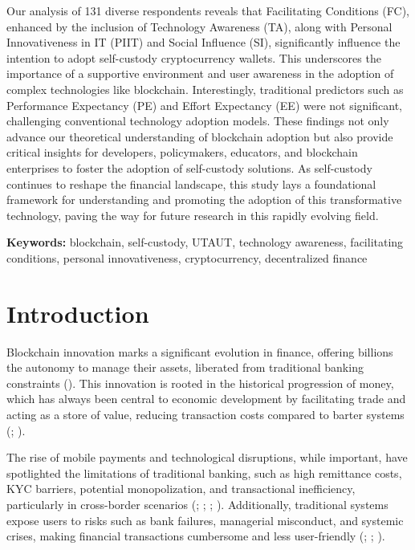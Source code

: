 \documentclass[twocolumn]{article}
\begin{document}
Our analysis of 131 diverse respondents reveals that Facilitating Conditions (FC), enhanced by the inclusion of Technology Awareness (TA), along with Personal Innovativeness in IT (PIIT) and Social Influence (SI), significantly influence the intention to adopt self-custody cryptocurrency wallets. This underscores the importance of a supportive environment and user awareness in the adoption of complex technologies like blockchain. Interestingly, traditional predictors such as Performance Expectancy (PE) and Effort Expectancy (EE) were not significant, challenging conventional technology adoption models. These findings not only advance our theoretical understanding of blockchain adoption but also provide critical insights for developers, policymakers, educators, and blockchain enterprises to foster the adoption of self-custody solutions. As self-custody continues to reshape the financial landscape, this study lays a foundational framework for understanding and promoting the adoption of this transformative technology, paving the way for future research in this rapidly evolving field.

\textbf{Keywords:} blockchain, self-custody, UTAUT, technology awareness, facilitating conditions, personal innovativeness, cryptocurrency, decentralized finance


\section{Introduction}
Blockchain innovation marks a significant evolution in finance, offering billions the autonomy to manage their assets, liberated from traditional banking constraints (\cite{nakamoto_bitcoin_2009}). This innovation is rooted in the historical progression of money, which has always been central to economic development by facilitating trade and acting as a store of value, reducing transaction costs compared to barter systems (\cite{davidson_money_1972}; \cite{kiyotaki_money_1989}).


The rise of mobile payments and technological disruptions, while important, have spotlighted the limitations of traditional banking, such as high remittance costs, KYC barriers, potential monopolization, and transactional inefficiency, particularly in cross-border scenarios (\cite{adrian_cross-border_2022}; \cite{ondrus_towards_2006}; \cite{pal_review_2019}; \cite{rochet_externalities_2006}). Additionally, traditional systems expose users to risks such as bank failures, managerial misconduct, and systemic crises, making financial transactions cumbersome and less user-friendly (\cite{bitar_bank_2016}; \cite{edwards_decline_1995}; \cite{iqbal_managerial_2019}).
\end{document}
